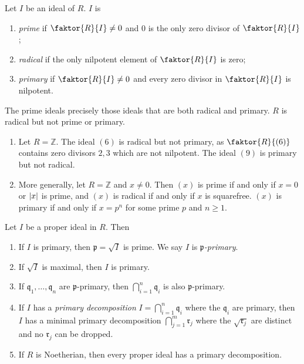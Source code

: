 \begin{definition}
    Let \( I \) be an ideal of \( R \).
    \( I \) is
    \begin{enumerate}
        \item \emph{prime} if \( \faktor{R}{I} \neq 0 \) and \( 0 \) is the only zero divisor of \( \faktor{R}{I} \);
        \item \emph{radical} if the only nilpotent element of \( \faktor{R}{I} \) is zero;
        \item \emph{primary} if \( \faktor{R}{I} \neq 0 \) and every zero divisor in \( \faktor{R}{I} \) is nilpotent.
    \end{enumerate}
\end{definition}
The prime ideals precisely those ideals that are both radical and primary.
\( R \) is radical but not prime or primary.
\begin{example}
    \begin{enumerate}
        \item Let \( R = \mathbb Z \).
        The ideal \( (6) \) is radical but not primary, as \( \faktor{R}{(6)} \) contains zero divisors \( 2, 3 \) which are not nilpotent.
        The ideal \( (9) \) is primary but not radical.
        \item More generally, let \( R = \mathbb Z \) and \( x \neq 0 \).
        Then \( (x) \) is prime if and only if \( x = 0 \) or \( \abs{x} \) is prime, and \( (x) \) is radical if and only if \( x \) is squarefree.
        \( (x) \) is primary if and only if \( x = p^n \) for some prime \( p \) and \( n \geq 1 \).
    \end{enumerate}
\end{example}
\begin{proposition}
    Let \( I \) be a proper ideal in \( R \).
    Then
    \begin{enumerate}
        \item If \( I \) is primary, then \( \mathfrak p = \sqrt{I} \) is prime.
        We say \( I \) is \emph{\( \mathfrak p \)-primary}.
        \item If \( \sqrt{I} \) is maximal, then \( I \) is primary.
        \item If \( \mathfrak q_1, \dots, \mathfrak q_n \) are \( \mathfrak p \)-primary, then \( \bigcap_{i=1}^n \mathfrak q_i \) is also \( \mathfrak p \)-primary.
        \item If \( I \) has a \emph{primary decomposition} \( I = \bigcap_{i=1}^n \mathfrak q_i \) where the \( \mathfrak q_i \) are primary, then \( I \) has a minimal primary decomposition \( \bigcap_{j=1}^m \mathfrak r_j \) where the \( \sqrt{\mathfrak r_j} \) are distinct and no \( \mathfrak r_j \) can be dropped.
        \item If \( R \) is Noetherian, then every proper ideal has a primary decomposition.
    \end{enumerate}
\end{proposition}
